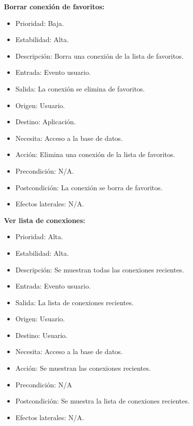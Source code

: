 \textbf{Borrar conexión de favoritos:}
\begin{itemize}
\item Prioridad: Baja.
\item Estabilidad: Alta.
\item Descripción: Borra una conexión de la lista de favoritos.
\item Entrada: Evento usuario.
\item Salida: La conexión se elimina de favoritos.
\item Origen: Usuario.
\item Destino: Aplicación.
\item Necesita: Acceso a la base de datos.
\item Acción: Elimina una conexión de la lista de favoritos.
\item Precondición: N/A.
\item Postcondición: La conexión se borra de favoritos.
\item Efectos laterales: N/A.\\

\end{itemize}
\newpage
\textbf{Ver lista de conexiones:}
\begin{itemize}
\item Prioridad: Alta.
\item Estabilidad: Alta.
\item Descripción: Se muestran todas las conexiones recientes.
\item Entrada: Evento usuario.
\item Salida: La lista de conexiones recientes.
\item Origen: Usuario.
\item Destino: Usuario.
\item Necesita: Acceso a la base de datos.
\item Acción: Se muestran las conexiones recientes.
\item Precondición: N/A
\item Postcondición: Se muestra la lista de conexiones recientes.
\item Efectos laterales: N/A.\\

\end{itemize}

